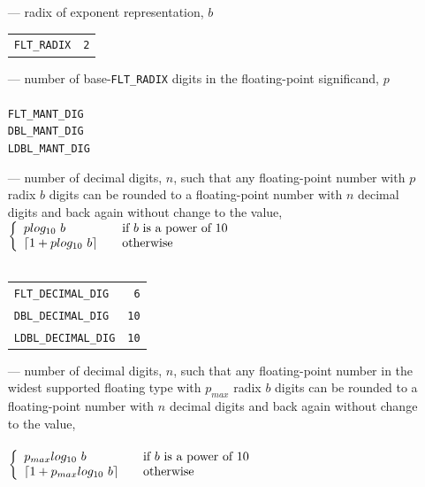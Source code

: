 \begin{itemize}
\item[---] radix of exponent representation, $b$\\
\begin{tabular}{lr}
\texttt{FLT\_RADIX}&\hfil\hspace*{2cm}\texttt{2}
\end{tabular}
\item[---] number of base-\texttt{FLT\_RADIX} digits in the floating-point significand,
  $p$\\\\
\texttt{FLT\_MANT\_DIG}\\
\texttt{DBL\_MANT\_DIG}\\
\texttt{LDBL\_MANT\_DIG}
\item[---] number of decimal digits, $n$, such that any floating-point number
  with $p$ radix $b$ digits can be rounded to a floating-point number with $n$
  decimal digits and back again without change to the value,\\
$\left\{ 
  \begin{array}{l l}
    plog_{10}~b & \quad \text{if $b$ is a power of 10}\\
    \lceil 1 + plog_{10}~b\rceil & \quad \text{otherwise}
  \end{array} \right. $\\\\
\begin{tabular}{lr}
\texttt{FLT\_DECIMAL\_DIG}&\hfil\hspace*{2cm}\texttt{6}\\
\texttt{DBL\_DECIMAL\_DIG}&\hfil\hspace*{2cm}\texttt{10}\\
\texttt{LDBL\_DECIMAL\_DIG}&\hfil\hspace*{2cm}\texttt{10}
\end{tabular}
\item[---] number of decimal digits, $n$, such that any floating-point number
in the widest supported floating type with $p_{max}$ radix $b$ digits can be
rounded to a floating-point number with $n$ decimal digits and back again
without change to the value,\\\\
$\left\{ 
  \begin{array}{l l}
    p_{max}log_{10}~b & \quad \text{if $b$ is a power of 10}\\
    \lceil 1 + p_{max}log_{10}~b\rceil & \quad \text{otherwise}
  \end{array} \right. $\\\\

\end{itemize}
